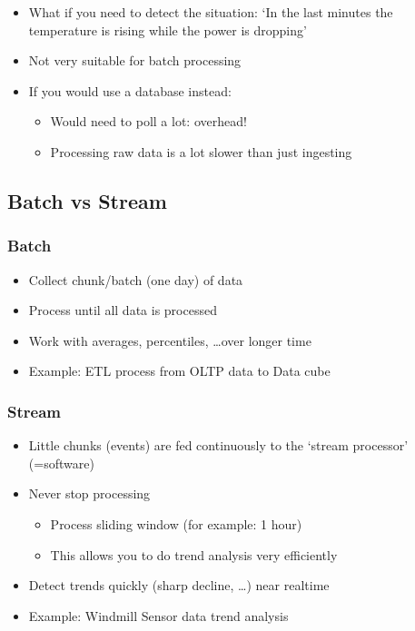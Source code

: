 \documentclass{article}
\begin{document}
\begin{itemize}
    \item What if you need to detect the situation: `In the last minutes the temperature is rising while the power is dropping'
    \item Not very suitable for batch processing
    \item If you would use a database instead:
    \begin{itemize}
        \item Would need to poll a lot: overhead!
        \item Processing raw data is a lot slower than just ingesting
    \end{itemize}
\end{itemize}

\subsection{Batch vs Stream}

\subsubsection{Batch}

\begin{itemize}
    \item Collect chunk/batch (one day) of data
    \item Process until all data is processed
    \item Work with averages, percentiles, \dots over longer time
    \item Example: ETL process from OLTP data to Data cube
\end{itemize}

\subsubsection{Stream}

\begin{itemize}
    \item Little chunks (events) are fed continuously to the `stream processor' (=software)
    \item Never stop processing
    \begin{itemize}
        \item Process sliding window (for example: 1 hour)
        \item This allows you to do trend analysis very efficiently
    \end{itemize}
    \item Detect trends quickly (sharp decline, \dots) near realtime
    \item Example: Windmill Sensor data trend analysis
\end{itemize}
\end{document}
